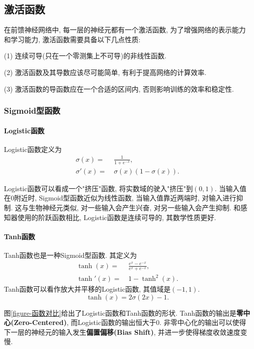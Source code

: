 \documentclass[12pt, a4paper, oneside]{ctexart}
\begin{document}
\subsection{激活函数}
在前馈神经网络中, 每一层的神经元都有一个激活函数, 为了增强网络的表示能力和学习能力, 激活函数需要具备以下几点性质:

(1) 连续可导(只在一个零测集上不可导)的非线性函数.

(2) 激活函数及其导数应该尽可能简单, 有利于提高网络的计算效率.

(3) 激活函数的导函数应在一个合适的区间内, 否则影响训练的效率和稳定性.
\subsubsection{Sigmoid型函数}
\paragraph{Logistic函数} Logistic函数定义为
\begin{align}
    \sigma(x) =&\ \frac{1}{1+e^{-x}},\\
    \sigma'(x) =&\ \sigma(x)(1-\sigma(x)).
\end{align}

Logistic函数可以看成一个"挤压"函数, 将实数域的驶入"挤压"到$(0,1)$. 当输入值在$0$附近时, Sigmoid型函数近似为线性函数, 当输入值靠近两端时, 对输入进行抑制. 这与生物神经元类似, 对一些输入会产生兴奋, 对另一些输入会产生抑制. 和感知器使用的阶跃函数相比, Logistic函数是连续可导的, 其数学性质更好.

\paragraph{Tanh函数}Tanh函数也是一种Sigmoid型函数. 其定义为
\begin{align}
    \tanh(x) =&\ \frac{e^x-e^{-x}}{e^{x}+e^{-x}},\\
    \tanh'(x) =&\ 1-\tanh^2(x).
\end{align}
Tanh函数可以看作放大并平移的Logistic函数, 其值域是$(-1,1)$.
\begin{equation}
    \tanh(x) = 2\sigma(2x)-1.
\end{equation}

图\ref{figure-函数对比}给出了Logistic函数和Tanh函数的形状. Tanh函数的输出是\textbf{零中心(Zero-Centered)}, 而Logistic函数的输出恒大于$0$. 非零中心化的输出可以使得下一层的神经元的输入发生\textbf{偏置偏移(Bias Shift)}, 并进一步使得梯度收敛速度变慢.
\end{document}
